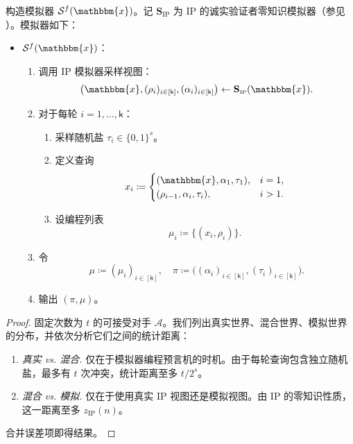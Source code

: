 \documentclass[american,singlepageview]{snargs-book-zh}
\newcommand{\Bits}{\{0,1\}}
\newcommand{\DefineEqual}{\coloneqq}
\newcommand{\Instance}{\mathbbm{x}}
\newcommand{\InstanceSize}{n}
\newcommand{\ProtoAdversary}{A}
\newcommand{\ProtoSimulator}{S}
\newcommand{\ProtoSalt}{\tau}
\newcommand{\ProtoZKError}{z}
\newcommand{\ProtoRoundComplexity}{\mathsf{k}}
\newcommand{\RoundIndex}{i}
\newcommand{\IPSubscript}{\scriptscriptstyle\mathrm{IP}}
\newcommand{\IPFormat}[1]{\mathbf{#1}}
\newcommand{\IPSimulator}{\IPFormat{\ProtoSimulator}_{\IPSubscript}}
\newcommand{\IPZKError}{\ProtoZKError_{\IPSubscript}}
\newcommand{\IPRoundComplexity}{\ProtoRoundComplexity}
\newcommand{\IPProverMessage}{\alpha}
\newcommand{\IPVerifierRandomMessage}{\rho}
\newcommand{\IPTuple}[1]{(#1_{\RoundIndex})_{\RoundIndex \in [\IPRoundComplexity]}}
\newcommand{\IPPublicSampledView}{\big(\Instance,\IPTuple{\IPVerifierRandomMessage},\IPTuple{\IPProverMessage}\big)}
\newcommand{\ARGFormat}[1]{\mathcal{#1}}
\newcommand{\ARGSimulator}{\ARGFormat{\ProtoSimulator}}
\newcommand{\ARGAdversary}{\ARGFormat{\ProtoAdversary}}
\newcommand{\ARGString}{\pi}
\newcommand{\ARGZKProgrammedList}{\ProgrammedList}
\newcommand{\ROFunction}{f}
\newcommand{\ROQueryBound}{t}
\newcommand{\ROQuery}{x}
\newcommand{\ProgrammedList}{\mu}
\newcommand{\RandSaltString}{\ProtoSalt}
\newcommand{\RandSaltSize}{s}
\newcommand{\FSFirstQuery}{(\Instance,\IPProverMessage_{1},\RandSaltString_{1})}
\newcommand{\FastFSLaterQuery}[1]{(\IPVerifierRandomMessage_{#1-1},\IPProverMessage_{#1},\RandSaltString_{#1})}
\newcommand{\FSARGString}{\big(\IPTuple{\IPProverMessage},\IPTuple{\RandSaltString}\big)}
\begin{document}
\begin{construction}
\label{construction:fs-simulator}
构造模拟器 $\ARGSimulator^{\ROFunction}(\Instance)$。记 $\IPSimulator$ 为 IP 的诚实验证者零知识模拟器（参见 ）。模拟器如下：
\begin{itemize}
  \item[] $\ARGSimulator^{\ROFunction}(\Instance)$：
  \begin{enumerate}[nolistsep]
    \item 调用 IP 模拟器采样视图：
    \[
    \IPPublicSampledView \gets \IPSimulator(\Instance).
    \]
    \item 对于每轮 $\RoundIndex=1,\dots,\IPRoundComplexity$：
    \begin{enumerate}[nolistsep]
      \item 采样随机盐 $\RandSaltString_{\RoundIndex}\in\Bits^{\RandSaltSize}$。
      \item 定义查询
      \[
      \ROQuery_{\RoundIndex}
      \DefineEqual
      \begin{cases}
      \FSFirstQuery, & \RoundIndex=1,\\
      \FastFSLaterQuery{\RoundIndex}, & \RoundIndex>1.
      \end{cases}
      \]
      \item 设编程列表
      \[
      \ARGZKProgrammedList_{\RoundIndex}
      \DefineEqual
      \{(\ROQuery_{\RoundIndex},\IPVerifierRandomMessage_{\RoundIndex})\}.
      \]
    \end{enumerate}
    \item 令
    \[
    \ARGZKProgrammedList \DefineEqual \IPTuple{\ARGZKProgrammedList},
    \quad
    \ARGString \DefineEqual \FSARGString.
    \]
    \item 输出 $(\ARGString,\ARGZKProgrammedList)$。
  \end{enumerate}
\end{itemize}
\end{construction}

\begin{proof}
固定次数为 $\ROQueryBound$ 的可接受对手 $\ARGAdversary$。我们列出真实世界、混合世界、模拟世界的分布，并依次分析它们之间的统计距离：
\begin{enumerate}
  \item \emph{真实 vs. 混合.} 仅在于模拟器编程预言机的时机。由于每轮查询包含独立随机盐，最多有 $\ROQueryBound$ 次冲突，统计距离至多 $\ROQueryBound/2^{\RandSaltSize}$。
  \item \emph{混合 vs. 模拟.} 仅在于使用真实 IP 视图还是模拟视图。由 IP 的零知识性质，这一距离至多 $\IPZKError(\InstanceSize)$。
\end{enumerate}
合并误差项即得结果。
\end{proof}
\end{document}
